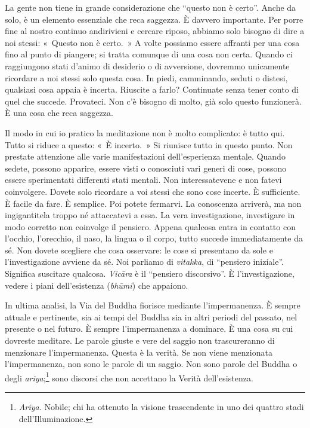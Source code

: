La gente non tiene in grande considerazione che ``questo non è certo''.
Anche da solo, è un elemento essenziale che reca saggezza. È davvero
importante. Per porre fine al nostro continuo andirivieni e cercare
riposo, abbiamo solo bisogno di dire a noi stessi: «~Questo non è
certo.~» A volte possiamo essere affranti per una cosa fino al punto di
piangere; si tratta comunque di una cosa non certa. Quando ci
raggiungono stati d'animo di desiderio o di avversione, dovremmo
unicamente ricordare a noi stessi solo questa cosa. In piedi,
camminando, seduti o distesi, qualsiasi cosa appaia è incerta. Riuscite
a farlo? Continuate senza tener conto di quel che succede. Provateci.
Non c'è bisogno di molto, già solo questo funzionerà. È una cosa che
reca saggezza.

Il modo in cui io pratico la meditazione non è molto complicato: è tutto
qui. Tutto si riduce a questo: «~È incerto.~» Si riunisce tutto in
questo punto. Non prestate attenzione alle varie manifestazioni
dell'esperienza mentale. Quando sedete, possono apparire, essere visti o
conosciuti vari generi di cose, possono essere sperimentati differenti
stati mentali. Non interessatevene e non fatevi coinvolgere. Dovete solo
ricordare a voi stessi che sono cose incerte. È sufficiente. È facile da
fare. È semplice. Poi potete fermarvi. La conoscenza arriverà, ma non
ingigantitela troppo né attaccatevi a essa. La vera investigazione,
investigare in modo corretto non coinvolge il pensiero. Appena qualcosa
entra in contatto con l'occhio, l'orecchio, il naso, la lingua o il
corpo, tutto succede immediatamente da sé. Non dovete scegliere che cosa
osservare: le cose si presentano da sole e l'investigazione avviene da
sé. Noi parliamo di \emph{vitakka}, di ``pensiero iniziale''. Significa
suscitare qualcosa. \emph{Vicāra} è il ``pensiero discorsivo''. È
l'investigazione, vedere i piani dell'esistenza (\emph{bhūmi}) che
appaiono.

In ultima analisi, la Via del Buddha fiorisce mediante l'impermanenza.
È sempre attuale e pertinente, sia ai tempi del Buddha sia in altri
periodi del passato, nel presente o nel futuro. È sempre l'impermanenza
a dominare. È una cosa su cui dovreste meditare. Le parole giuste e vere
del saggio non trascureranno di menzionare l'impermanenza. Questa è la
verità. Se non viene menzionata l'impermanenza, non sono le parole di
un saggio. Non sono parole del Buddha o degli \emph{ariya};\footnote{\emph{Ariya.}
  Nobile; chi ha ottenuto la visione trascendente in uno dei quattro
  stadi dell'Illuminazione.} sono discorsi che non accettano la Verità
dell'esistenza.

